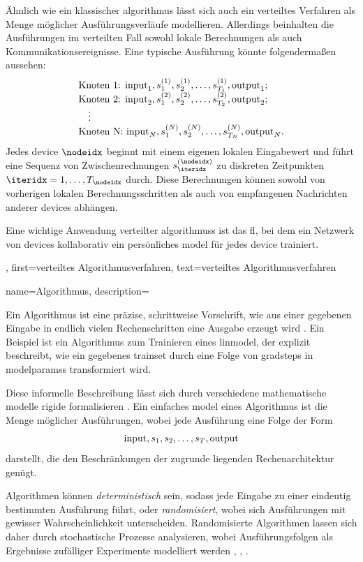 {{{{{		Ähnlich wie ein klassischer \gls{algorithmus} lässt sich auch ein verteiltes Verfahren als 
		Menge möglicher Ausführungsverläufe modellieren. Allerdings beinhalten die Ausführungen im 
		verteilten Fall sowohl lokale Berechnungen als auch Kommunikationsereignisse. 
		Eine typische Ausführung könnte folgendermaßen aussehen:
		\[
		\begin{array}{l}
			\text{Knoten 1: } {\rm input}_1, s_1^{(1)}, s_2^{(1)}, \ldots, s_{T_1}^{(1)}, {\rm output}_1; \\
			\text{Knoten 2: } {\rm input}_2, s_1^{(2)}, s_2^{(2)}, \ldots, s_{T_2}^{(2)}, {\rm output}_2; \\
			\quad \vdots \\
			\text{Knoten N: } {\rm input}_N, s_1^{(N)}, s_2^{(N)}, \ldots, s_{T_N}^{(N)}, {\rm output}_N.
		\end{array}
		\]
		Jedes \gls{device} $\nodeidx$ beginnt mit einem eigenen lokalen Eingabewert und führt eine Sequenz 
		von Zwischenrechnungen $s_{\iteridx}^{(\nodeidx)}$ zu diskreten Zeitpunkten $\iteridx = 1, \dots, T_\nodeidx$ durch. 
		Diese Berechnungen können sowohl von vorherigen lokalen Berechnungsschritten als auch von empfangenen 
		Nachrichten anderer \gls{device}s abhängen. 
		
		Eine wichtige Anwendung verteilter \glspl{algorithmus} ist das \gls{fl}, bei dem ein Netzwerk 
		von \glspl{device} kollaborativ ein persönliches \gls{model} für jedes \gls{device} trainiert.},
	first={verteiltes Algorithmusverfahren}, text={verteiltes Algorithmusverfahren}
}

{name={Algorithmus},
	description={Ein Algorithmus ist eine präzise, schrittweise Vorschrift, 
		wie aus einer gegebenen Eingabe in endlich vielen Rechenschritten eine Ausgabe erzeugt wird \cite{Cormen:2022aa}. 
		Ein Beispiel ist ein Algorithmus zum Trainieren eines \gls{linmodel}, der explizit beschreibt, 
		wie ein gegebenes \gls{trainset} durch eine Folge von \glspl{gradstep} in \glspl{modelparams} 
		transformiert wird. 
		
		Diese informelle Beschreibung lässt sich durch verschiedene mathematische \gls{model}le 
		rigide formalisieren \cite{Sipser2013}. Ein einfaches \gls{model} eines Algorithmus ist 
		die Menge möglicher Ausführungen, wobei jede Ausführung eine Folge der Form
		$${\rm input},s_1,s_2,\ldots,s_T,{\rm output}$$
		darstellt, die den Beschränkungen der zugrunde liegenden Rechenarchitektur genügt.
		
		Algorithmen können \emph{deterministisch} sein, sodass jede Eingabe zu einer eindeutig bestimmten 
		Ausführung führt, oder \emph{randomisiert}, wobei sich Ausführungen mit gewisser Wahrscheinlichkeit 
		unterscheiden. Randomisierte Algorithmen lassen sich daher durch stochastische Prozesse analysieren, 
		wobei Ausführungsfolgen als Ergebnisse zufälliger Experimente modelliert werden 
		\cite{BertsekasProb}, \cite{RandomizedAlgos}, \cite{Gallager13}.
		
}}}}}
